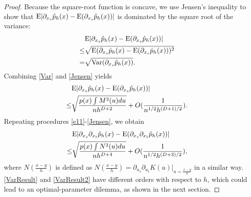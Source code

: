 \documentclass[aos,preprint]{imsart}
\theoremstyle{remark}
\begin{document}
\begin{appendix}
\begin{proof}
Because the square-root function is concave, we use Jensen's inequality to show that ${\rm E} |\partial_{x_s} \hat{p}_h(x)-{\rm E}(\partial_{x_s} \hat{p}_h(x))|$ is dominated by the square root of the variance:
\begin{equation}\label{Jensen}
\begin{aligned}
 & {\rm E}|\partial_{x_s} \hat{p}_h(x)-{\rm E}(\partial_{x_s} \hat{p}_h(x))|\\
\leq &\sqrt{{\rm E}(\partial_{x_s} \hat{p}_h(x)-{\rm E}(\partial_{x_s} \hat{p}_h(x)))^2}\\
 = & \sqrt{{\rm Var}(\partial_{x_s}\hat{p}_h(x))} .
\end{aligned}
\end{equation}
Combining \eqref{Var} and \eqref{Jensen} yields
\begin{equation}\label{VarResult}
\begin{aligned}
&{\rm E} |\partial_{x_s} \hat{p}_h(x)-{\rm E}(\partial_{x_s} \hat{p}_h(x))| \\
\leq &\sqrt{\frac{p(x)\int M^2(u)du}{n h^{D+2}}}+O(\frac{1}{n^{1/2}h^{(D+1)/2}}).
\end{aligned}
\end{equation}
Repeating procedures \eqref{e11}-\eqref{Jensen},  we obtain
\begin{equation}\label{VarResult2}
\begin{aligned}
&{\rm E} | \partial_{x_s}\partial_{x_t} \hat{p}_h(x) -{\rm E}(\partial_{x_s}\partial_{x_t} \hat{p}_h(x))| \\
\leq & \sqrt{\frac{p(x)\int N^2(u)du}{nh^{D+4}}}+O(\frac{1}{n^{1/2}h^{(D+3)/2}}),
\end{aligned}
\end{equation}
where $N(\frac{x-y}{h}) $ is defined as $N(\frac{x-y}{h}) = \partial_ {u_s}\partial_{u_t}  K(u)|_{u=\frac{x-y}{h}}$ in a similar way.
\eqref{VarResult} and \eqref{VarResult2} have different orders with respect to $h$, which could lead to an optimal-parameter dilemma, as shown in the next section.
\end{proof}

\end{appendix}
\end{document}
